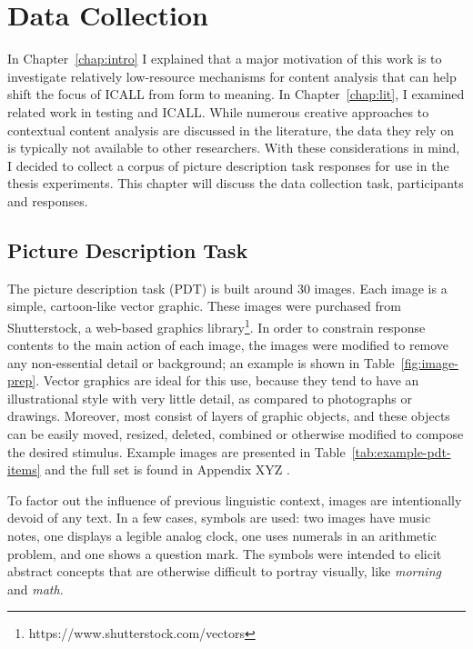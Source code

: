 \chapter{Data Collection}
\label{chap:data}

In Chapter~\ref{chap:intro} I explained that a major motivation of this work is to investigate relatively low-resource mechanisms for content analysis that can help shift the focus of ICALL from form to meaning. In Chapter~\ref{chap:lit}, I examined related work in testing and ICALL. While numerous creative approaches to contextual content analysis are discussed in the literature, the data they rely on is typically not available to other researchers. With these considerations in mind, I decided to collect a corpus of picture description task responses for use in the thesis experiments. This chapter will discuss the data collection task, participants and responses.

\section{Picture Description Task}
\label{sec:pdt}


The picture description task (PDT) is built around 30 images. Each image is a simple, cartoon-like vector graphic. These images were purchased from Shutterstock, a web-based graphics library\footnote{https://www.shutterstock.com/vectors}. In order to constrain response contents to the main action of each image, the images were modified to remove any non-essential detail or background; an example is shown in Table~\ref{fig:image-prep}. Vector graphics are ideal for this use, because they tend to have an illustrational style with very little detail, as compared to photographs or drawings. Moreover, most consist of layers of graphic objects, and these objects can be easily moved, resized, deleted, combined or otherwise modified to compose the desired stimulus. Example images are presented in Table~\ref{tab:example-pdt-items} and the full set is found in Appendix XYZ .

To factor out the influence of previous linguistic context, images are intentionally devoid of any text. In a few cases, symbols are used: two images have music notes, one displays a legible analog clock, one uses numerals in an arithmetic problem, and one shows a question mark. The symbols were intended to elicit abstract concepts that are otherwise difficult to portray visually, like \textit{morning} and \textit{math}. 

